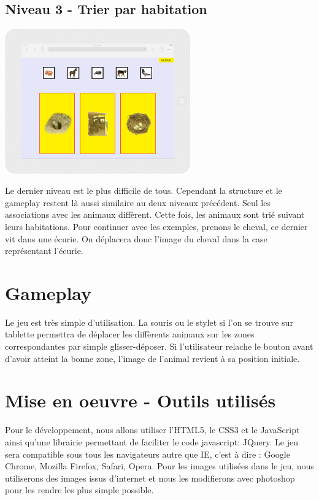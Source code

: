\documentclass{article}
\begin{document}
\subsection{Niveau 3 - Trier par habitation}
\vspace{0.5cm}
\begin{center}
\includegraphics[width=0.6\textwidth]{page4}
\end{center}
\vspace{0.5cm}
\hspace*{0.6cm}Le dernier niveau est le plus difficile de tous. Cependant la structure et le gameplay restent l\`a aussi similaire au deux niveaux pr\'ec\'edent. Seul les associations avec les animaux diff\`erent. Cette fois, les animaux sont tri\'e suivant leurs habitations. Pour continuer avec les exemples, prenons le cheval, ce dernier vit dans une \'ecurie. On d\'eplacera donc l'image du cheval dans la case repr\'esentant l'\'ecurie.
    
\section{Gameplay}
\hspace*{0.6cm}Le jeu est tr\`es simple d'utilisation. La souris ou le stylet si l'on se trouve sur tablette permettra de d\'eplacer les diff\`erents animaux sur les zones correspondantes par simple glisser-d\'eposer. Si l'utilisateur relache le bouton avant d'avoir atteint la bonne zone, l'image de l'animal revient \`a sa position initiale.


\section{Mise en oeuvre - Outils utilis\'es}
\hspace*{0.6cm}Pour le d\'eveloppement, nous allons utiliser l'HTML5, le CSS3 et le JavaScript ainsi qu'une librairie permettant de faciliter le code javascript: JQuery. Le jeu sera compatible sous tous les navigateurs autre que IE, c'est \`a dire : Google Chrome, Mozilla Firefox, Safari, Opera.
Pour les images utilis\'ees dans le jeu, nous utiliserons des images issus d'internet et nous les modifierons avec photoshop pour les rendre les plus simple possible.
\end{document}
